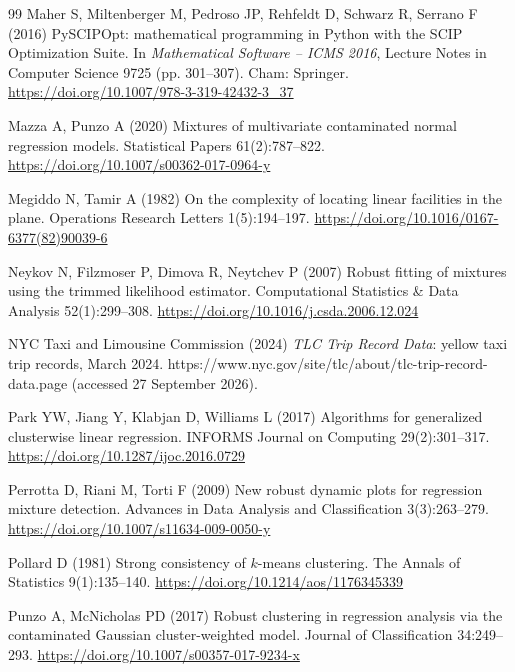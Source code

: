 \begin{thebibliography}{99}
 Maher S, Miltenberger M, Pedroso JP, Rehfeldt D, Schwarz R, Serrano F (2016) PySCIPOpt: mathematical programming in Python with the SCIP Optimization Suite. In \textit{Mathematical Software -- ICMS 2016}, Lecture Notes in Computer Science 9725 (pp. 301--307). Cham: Springer. \url{https://doi.org/10.1007/978-3-319-42432-3\_37}

 Mazza A, Punzo A (2020) Mixtures of multivariate contaminated normal regression models. Statistical Papers 61(2):787--822. \url{https://doi.org/10.1007/s00362-017-0964-y}

 Megiddo N, Tamir A (1982) On the complexity of locating linear facilities in the plane. Operations Research Letters 1(5):194--197. \url{https://doi.org/10.1016/0167-6377(82)90039-6}

 Neykov N, Filzmoser P, Dimova R, Neytchev P (2007) Robust fitting of mixtures using the trimmed likelihood estimator. Computational Statistics \& Data Analysis 52(1):299--308. \url{https://doi.org/10.1016/j.csda.2006.12.024}

 NYC Taxi and Limousine Commission (2024) \textit{TLC Trip Record Data}: yellow taxi trip records, March 2024. https://www.nyc.gov/site/tlc/about/tlc-trip-record-data.page (accessed 27 September 2026).

 Park YW, Jiang Y, Klabjan D, Williams L (2017) Algorithms for generalized clusterwise linear regression. INFORMS Journal on Computing 29(2):301--317. \url{https://doi.org/10.1287/ijoc.2016.0729}

 Perrotta D, Riani M, Torti F (2009) New robust dynamic plots for regression mixture detection. Advances in Data Analysis and Classification 3(3):263--279. \url{https://doi.org/10.1007/s11634-009-0050-y}

 Pollard D (1981) Strong consistency of
$k$-means clustering. The Annals of Statistics 9(1):135--140. \url{https://doi.org/10.1214/aos/1176345339}

 Punzo A, McNicholas PD (2017) Robust clustering in regression analysis via the contaminated Gaussian cluster-weighted model. Journal of Classification 34:249--293. \url{https://doi.org/10.1007/s00357-017-9234-x}


\end{thebibliography}
